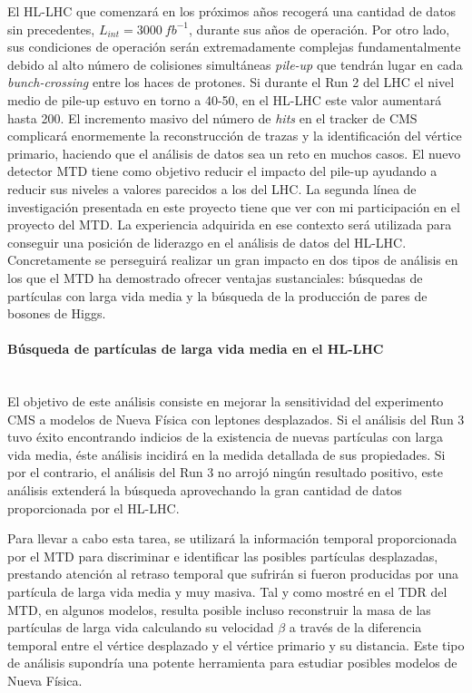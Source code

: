 El HL-LHC que comenzará en los próximos años recogerá una cantidad de datos sin precedentes, $L_{int}=3000~fb^{-1}$, durante sus años de operación. Por otro lado, sus condiciones de operación serán extremadamente complejas fundamentalmente debido al alto número de colisiones simultáneas \emph{pile-up} que tendrán lugar en cada \emph{bunch-crossing} entre los haces de protones. Si durante el Run 2 del LHC el nivel medio de pile-up estuvo en torno a 40-50, en el HL-LHC este valor aumentará hasta 200. El incremento masivo del número de \emph{hits} en el tracker de CMS complicará enormemente la reconstrucción de trazas y la identificación del vértice primario, haciendo que el análisis de datos sea un reto en muchos casos. El nuevo detector MTD tiene como objetivo reducir el impacto del pile-up ayudando a reducir sus niveles a valores parecidos a los del LHC. La segunda línea de investigación presentada en este proyecto tiene que ver con mi participación en el proyecto del MTD. La experiencia adquirida en ese contexto será utilizada para conseguir una posición de liderazgo en el análisis de datos del HL-LHC. Concretamente se perseguirá realizar un gran impacto en dos tipos de análisis en los que el MTD ha demostrado ofrecer ventajas sustanciales: búsquedas de partículas con larga vida media y la búsqueda de la producción de pares de bosones de Higgs.

\paragraph{Búsqueda de partículas de larga vida media en el HL-LHC\\\\}

El objetivo de este análisis consiste en mejorar la sensitividad del experimento CMS a modelos de Nueva Física con leptones desplazados. Si el análisis del Run 3 tuvo éxito encontrando indicios de la existencia de nuevas partículas con larga vida media, éste análisis incidirá en la medida detallada de sus propiedades. Si por el contrario, el análisis del Run 3 no arrojó ningún resultado positivo, este análisis extenderá la búsqueda aprovechando la gran cantidad de datos proporcionada por el HL-LHC. 

Para llevar a cabo esta tarea, se utilizará la información temporal proporcionada por el MTD para discriminar e identificar las posibles partículas desplazadas, prestando atención al retraso temporal que sufrirán si fueron producidas por una partícula de larga vida media y muy masiva. Tal y como mostré en el TDR del MTD, en algunos modelos, resulta posible incluso reconstruir la masa de las partículas de larga vida calculando su velocidad $\beta$ a través de la diferencia temporal entre el vértice desplazado y el vértice primario y su distancia. Este tipo de análisis supondría una potente herramienta para estudiar posibles modelos de Nueva Física. 

